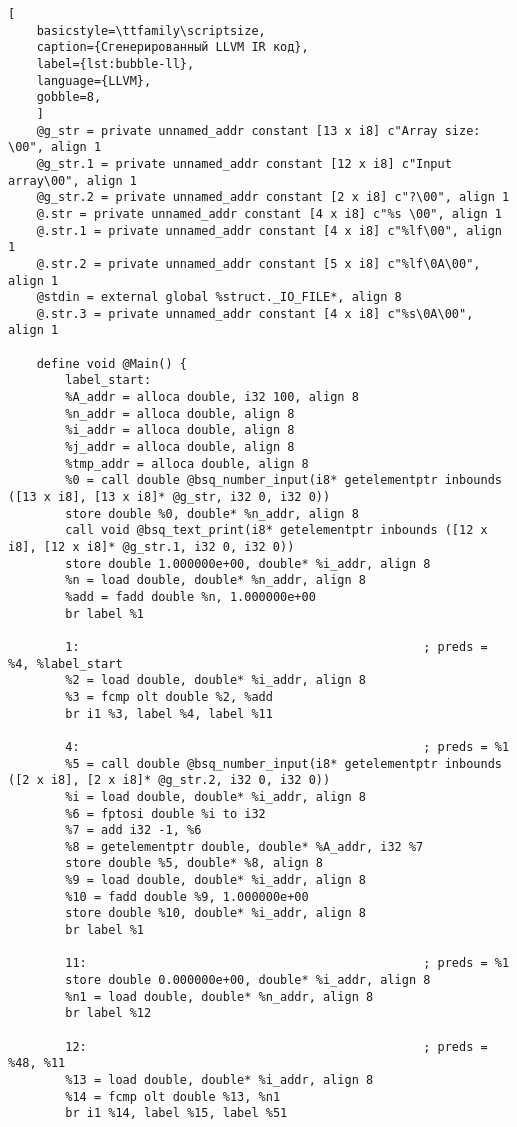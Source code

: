 \begin{lstlisting}[
	basicstyle=\ttfamily\scriptsize,
	caption={Сгенерированный LLVM IR код},
	label={lst:bubble-ll},
	language={LLVM},
	gobble=8,
	]
	@g_str = private unnamed_addr constant [13 x i8] c"Array size: \00", align 1
	@g_str.1 = private unnamed_addr constant [12 x i8] c"Input array\00", align 1
	@g_str.2 = private unnamed_addr constant [2 x i8] c"?\00", align 1
	@.str = private unnamed_addr constant [4 x i8] c"%s \00", align 1
	@.str.1 = private unnamed_addr constant [4 x i8] c"%lf\00", align 1
	@.str.2 = private unnamed_addr constant [5 x i8] c"%lf\0A\00", align 1
	@stdin = external global %struct._IO_FILE*, align 8
	@.str.3 = private unnamed_addr constant [4 x i8] c"%s\0A\00", align 1

	define void @Main() {
		label_start:
		%A_addr = alloca double, i32 100, align 8
		%n_addr = alloca double, align 8
		%i_addr = alloca double, align 8
		%j_addr = alloca double, align 8
		%tmp_addr = alloca double, align 8
		%0 = call double @bsq_number_input(i8* getelementptr inbounds ([13 x i8], [13 x i8]* @g_str, i32 0, i32 0))
		store double %0, double* %n_addr, align 8
		call void @bsq_text_print(i8* getelementptr inbounds ([12 x i8], [12 x i8]* @g_str.1, i32 0, i32 0))
		store double 1.000000e+00, double* %i_addr, align 8
		%n = load double, double* %n_addr, align 8
		%add = fadd double %n, 1.000000e+00
		br label %1

		1:                                                ; preds = %4, %label_start
		%2 = load double, double* %i_addr, align 8
		%3 = fcmp olt double %2, %add
		br i1 %3, label %4, label %11

		4:                                                ; preds = %1
		%5 = call double @bsq_number_input(i8* getelementptr inbounds ([2 x i8], [2 x i8]* @g_str.2, i32 0, i32 0))
		%i = load double, double* %i_addr, align 8
		%6 = fptosi double %i to i32
		%7 = add i32 -1, %6
		%8 = getelementptr double, double* %A_addr, i32 %7
		store double %5, double* %8, align 8
		%9 = load double, double* %i_addr, align 8
		%10 = fadd double %9, 1.000000e+00
		store double %10, double* %i_addr, align 8
		br label %1

		11:                                               ; preds = %1
		store double 0.000000e+00, double* %i_addr, align 8
		%n1 = load double, double* %n_addr, align 8
		br label %12

		12:                                               ; preds = %48, %11
		%13 = load double, double* %i_addr, align 8
		%14 = fcmp olt double %13, %n1
		br i1 %14, label %15, label %51


\end{lstlisting}
